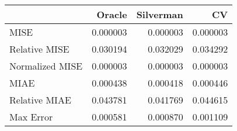 \begin{tabular}{lrrr}
  \hline
 & Oracle & Silverman & CV \\ 
  \hline
MISE & 0.000003 & 0.000003 & 0.000003 \\ 
  Relative MISE & 0.030194 & 0.032029 & 0.034292 \\ 
  Normalized MISE & 0.000003 & 0.000003 & 0.000003 \\ 
  MIAE & 0.000438 & 0.000418 & 0.000446 \\ 
  Relative MIAE & 0.043781 & 0.041769 & 0.044615 \\ 
  Max Error & 0.000581 & 0.000870 & 0.001109 \\ 
   \hline
\end{tabular}
